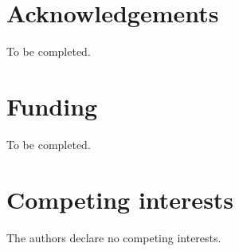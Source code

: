 \documentclass[11pt]{article}
\begin{document}



\section*{Acknowledgements}
To be completed.


\section*{Funding}
To be completed.

\section*{Competing interests}
The authors declare no competing interests.
\end{document}
